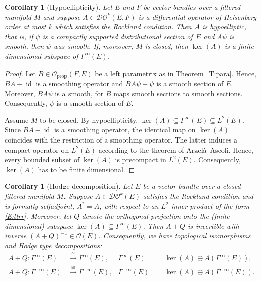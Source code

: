 \documentclass[reqno,12pt]{amsart}
\DeclareMathOperator{\id}{id}
\newcommand{\DO}{\mathcal D\mathcal O}
\newcommand\prop{\textrm{prop}}
\theoremstyle{plain}
\newtheorem{corollary}[theorem]{Corollary}
\theoremstyle{definition}
\begin{document}
\begin{corollary}[Hypoellipticity]\label{C:hypo}
Let $E$ and $F$ be vector bundles over a filtered manifold $M$ and suppose $A\in\DO^k(E,F)$ is a differential operator of Heisenberg order at most $k$ which satisfies the Rockland condition.
Then $A$ is hypoelliptic, that is, if $\psi$ is a compactly supported distributional section of $E$ and $A\psi$ is smooth, then $\psi$ was smooth.
If, moreover, $M$ is closed, then $\ker(A)$ is a finite dimensional subspace of\/ $\Gamma^\infty(E)$.
\end{corollary}


\begin{proof}
Let $B\in\mathcal O_\prop(F,E)$ be a left parametrix as in Theorem~\ref{T:para}.
Hence, $BA-\id$ is a smoothing operator and $BA\psi-\psi$ is a smooth section of $E$.
Moreover, $BA\psi$ is a smooth, for $B$ maps smooth sections to smooth sections.
Consequently, $\psi$ is a smooth section of $E$.


Assume $M$ to be closed.
By hypoellipticity, $\ker(A)\subseteq\Gamma^\infty(E)\subseteq L^2(E)$.
Since $BA-\id$ is a smoothing operator, the identical map on $\ker(A)$ coincides with the restriction of a smoothing operator.
The latter induces a compact operator on $L^2(E)$ according to the theorem of Arzel\`a--Ascoli.
Hence, every bounded subset of $\ker(A)$ is precompact in $L^2(E)$.
Consequently, $\ker(A)$ has to be finite dimensional.
\end{proof}


\begin{corollary}[Hodge decomposition]\label{C:smooth-Hodge-decomposition}
Let $E$ be a vector bundle over a closed filtered manifold $M$.
Suppose $A\in\DO^k(E)$ satisfies the Rockland condition and is formally selfadjoint, $A^*=A$, with respect to an $L^2$ inner product of the form \eqref{E:llrr}.
Moreover, let $Q$ denote the orthogonal projection onto the (finite dimensional) subspace $\ker(A)\subseteq\Gamma^\infty(E)$.
Then $A+Q$ is invertible with inverse $(A+Q)^{-1}\in\mathcal O(E)$.
Consequently, we have topological isomorphisms and Hodge type decompositions:
\begin{align*}
A+Q\colon\Gamma^\infty(E)&\xrightarrow\cong\Gamma^\infty(E),&\Gamma^\infty(E)&=\ker(A)\oplus A(\Gamma^\infty(E)),\\
A+Q\colon\Gamma^{-\infty}(E)&\xrightarrow\cong\Gamma^{-\infty}(E),&\Gamma^{-\infty}(E)&=\ker(A)\oplus A(\Gamma^{-\infty}(E)).
\end{align*}
\end{corollary}
\end{document}
